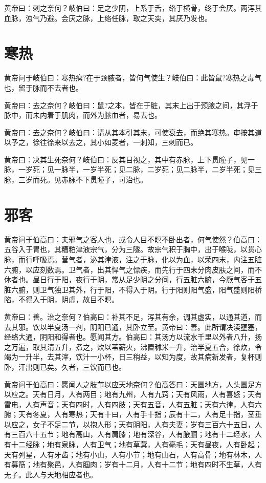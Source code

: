\documentclass[a4paper,12pt,UTF8,twoside]{ctexbook}
\begin{document}
	黄帝曰：刺之奈何？岐伯曰：足之少阴，上系于舌，络于横骨，终于会厌。两泻其血脉，浊气乃避。会厌之脉，上络任脉，取之天突，其厌乃发也。
	
	\chapter{寒热}
	
	黄帝问于岐伯曰：寒热瘰?在于颈腋者，皆何气使生？岐伯曰：此皆鼠?寒热之毒气也，留于脉而不去者也。
	
	黄帝曰：去之奈何？岐伯曰：鼠?之本，皆在于脏，其末上出于颈腋之间，其浮于脉中，而未内着于肌肉，而外为脓血者，易去也。
	
	黄帝曰：去之奈何？岐伯曰：请从其本引其末，可使衰去，而绝其寒热。审按其道以予之，徐往徐来以去之，其小如麦者，一刺知，三刺而已。
	
	黄帝曰：决其生死奈何？岐伯曰：反其目视之，其中有赤脉，上下贯瞳子，见一脉，一岁死；见一脉半，一岁半死；见二脉，二岁死；见二脉半，二岁半死；见三脉，三岁而死。见赤脉不下贯瞳子，可治也。
	
	\chapter{邪客}
	
	黄帝问于伯高曰：夫邪气之客人也，或令人目不瞑不卧出者，何气使然？伯高曰：五谷入于胃也，其糟粕津液宗气，分为三隧。故宗气积于胸中，出于喉咙，以贯心脉，而行呼吸焉。营气者，泌其津液，注之于脉，化以为血，以荣四末，内注五脏六腑，以应刻数焉。卫气者，出其悍气之慓疾，而先行于四末分肉皮肤之间，而不休者也。昼日行于阳，夜行于阴，常从足少阴之分间，行五脏六腑，今厥气客于五脏六腑，则卫气独卫其外，行于阳，不得入于阴。行于阳则阳气盛，阳气盛则阳桥陷，不得入于阴，阴虚，故目不瞑。
	
	黄帝曰：善。治之奈何？伯高曰：补其不足，泻其有余，调其虚实，以通其道，而去其邪。饮以半夏汤一剂，阴阳已通，其卧立至。黄帝曰：善。此所谓决渎壅塞，经络大通，阴阳和得者也。愿闻其方。伯高曰：其汤方以流水千里以外者八升，扬之万遍，取其清五升，煮之，炊以苇薪火，沸置秫米一升，治半夏五合，徐炊，令竭为一升半，去其滓，饮汁一小杯，日三稍益，以知为度，故其病新发者，复杯则卧，汗出则已矣。久者，三饮而已也。
	
	黄帝问于伯高曰：愿闻人之肢节以应天地奈何？伯高答曰：天圆地方，人头圆足方以应之。天有日月，人有两目；地有九州，人有九窍；天有风雨，人有喜怒；天有雷电，人有声音；天有四时，人有四肢；天有五音，人有五脏；天有六律，人有六腑；天有冬夏，人有寒热；天有十曰，人有手十指；辰有十二，人有足十指，茎垂以应之，女子不足二节，以抱人形；天有阴阳，人有夫妻；岁有三百六十五日，人有三百六十五节；地有高山，人有肩膝；地有深谷，人有腋腘；地有十二经水，人有十二经脉；地有泉脉，人有卫气；地有草蓂，人有毫毛；天有昼夜，人有卧起；天有列星，人有牙齿；地有小山，人有小节；地有山石，人有高骨；地有林木，人有募筋；地有聚邑，人有腘肉；岁有十二月，人有十二节；地有四时不生草，人有无子。此人与天地相应者也。
	
\end{document}
